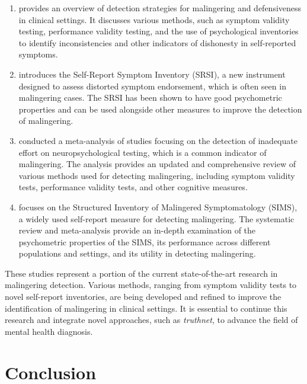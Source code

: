 \documentclass[onecolumn, compsoc,10pt]{IEEEtran}
\begin{document}
\begin{enumerate}
    \item \cite{rogers2008} provides an overview of detection strategies for malingering and defensiveness in clinical settings. It discusses various methods, such as symptom validity testing, performance validity testing, and the use of psychological inventories to identify inconsistencies and other indicators of dishonesty in self-reported symptoms.
    
    \item \cite{merten2016} introduces the Self-Report Symptom Inventory (SRSI), a new instrument designed to assess distorted symptom endorsement, which is often seen in malingering cases. The SRSI has been shown to have good psychometric properties and can be used alongside other measures to improve the detection of malingering.
    
    \item \cite{sollman2011} conducted a meta-analysis of studies focusing on the detection of inadequate effort on neuropsychological testing, which is a common indicator of malingering. The analysis provides an updated and comprehensive review of various methods used for detecting malingering, including symptom validity tests, performance validity tests, and other cognitive measures.
    
    \item \cite{vanimpelen2014} focuses on the Structured Inventory of Malingered Symptomatology (SIMS), a widely used self-report measure for detecting malingering. The systematic review and meta-analysis provide an in-depth examination of the psychometric properties of the SIMS, its performance across different populations and settings, and its utility in detecting malingering.
\end{enumerate}

These studies represent a portion of the current state-of-the-art research in malingering detection. Various methods, ranging from symptom validity tests to novel self-report inventories, are being developed and refined to improve the identification of malingering in clinical settings. It is essential to continue this research and integrate novel approaches, such as \textit{truthnet}, to advance the field of mental health diagnosis.

\section{Conclusion}
\end{document}
